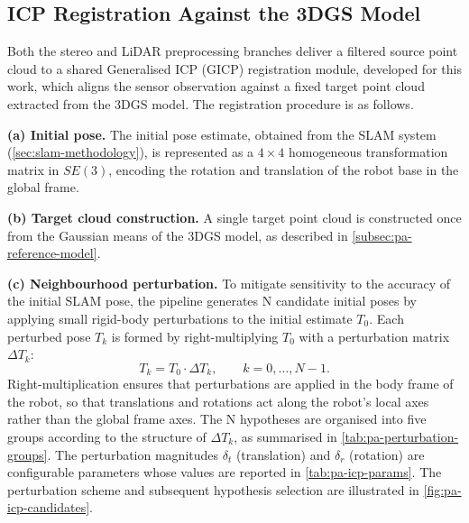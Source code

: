 \subsection{ICP Registration Against the 3DGS Model}
\label{subsec:pa-icp-registration}

Both the stereo and LiDAR preprocessing branches deliver a filtered source point cloud to a shared Generalised ICP (GICP) registration module, developed for this work, which aligns the sensor observation against a fixed target point cloud extracted from the 3DGS model. The registration procedure is as follows.

\textbf{(a) Initial pose.} The initial pose estimate, obtained from the SLAM system (\cref{sec:slam-methodology}), is represented as a $4 \times 4$ homogeneous transformation matrix in $SE(3)$, encoding the rotation and translation of the robot base in the global frame.

\textbf{(b) Target cloud construction.} A single target point cloud is constructed once from the Gaussian means of the 3DGS model, as described in \cref{subsec:pa-reference-model}.

\textbf{(c) Neighbourhood perturbation.} To mitigate sensitivity to the accuracy of the initial SLAM pose, the pipeline generates N candidate initial poses by applying small rigid-body perturbations to the initial estimate $T_0$. Each perturbed pose $T_k$ is formed by right-multiplying $T_0$ with a perturbation matrix $\Delta T_k$:
%
\begin{equation}
    T_k = T_0 \cdot \Delta T_k, \qquad k = 0, \ldots, N-1.
    \label{eq:perturbation}
\end{equation}
%
Right-multiplication ensures that perturbations are applied in the body frame of the robot, so that translations and rotations act along the robot's local axes rather than the global frame axes. The N hypotheses are organised into five groups according to the structure of $\Delta T_k$, as summarised in \cref{tab:pa-perturbation-groups}. The perturbation magnitudes $\delta_t$ (translation) and $\delta_r$ (rotation) are configurable parameters whose values are reported in \cref{tab:pa-icp-params}. The perturbation scheme and subsequent hypothesis selection are illustrated in \cref{fig:pa-icp-candidates}.

